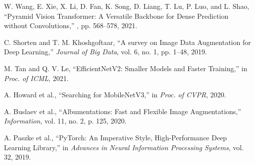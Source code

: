 \documentclass[preprint,12pt]{elsarticle}
\begin{document}
\begin{thebibliography}{99}
W. Wang, E. Xie, X. Li, D. Fan, K. Song, D. Liang, T. Lu, P. Luo, and L. Shao,
\newblock ``Pyramid Vision Transformer: A Versatile Backbone for Dense Prediction without Convolutions,''
, pp. 568--578, 2021.

C. Shorten and T. M. Khoshgoftaar,
``A survey on Image Data Augmentation for Deep Learning,''
\emph{Journal of Big Data}, vol. 6, no. 1, pp. 1–48, 2019.

M. Tan and Q. V. Le,
``EfficientNetV2: Smaller Models and Faster Training,''
in \emph{Proc. of ICML}, 2021.

A. Howard et al.,
``Searching for MobileNetV3,''
in \emph{Proc. of CVPR}, 2020.

A. Buslaev et al.,
``Albumentations: Fast and Flexible Image Augmentations,''
\emph{Information}, vol. 11, no. 2, p. 125, 2020.

A. Paszke et al.,
``PyTorch: An Imperative Style, High-Performance Deep Learning Library,''
in \emph{Advances in Neural Information Processing Systems}, vol. 32, 2019.

\end{thebibliography}
\endgroup
\end{document}
